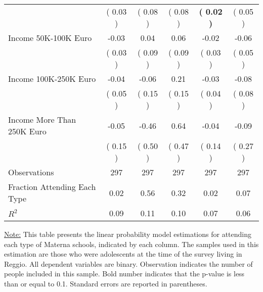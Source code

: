 \begin{table}[H]
{\begin{tabular}{lccccc}
\quad  & (     0.03 ) & (     0.08 )  & (     0.08 )  & \textbf{(     0.02 )} & (     0.05 ) \\
\quad Income 50K-100K Euro &     -0.03 &      0.04 &      0.06 &     -0.02 &     -0.06 \\
\quad  & (     0.03 ) & (     0.09 )  & (     0.09 )  & (     0.03 ) & (     0.05 ) \\
\quad Income 100K-250K Euro &     -0.04 &     -0.06 &      0.21 &     -0.03 &     -0.08 \\
\quad  & (     0.05 ) & (     0.15 )  & (     0.15 )  & (     0.04 ) & (     0.08 ) \\
\quad Income More Than 250K Euro &     -0.05 &     -0.46 &      0.64 &     -0.04 &     -0.09 \\
\quad  & (     0.15 ) & (     0.50 )  & (     0.47 )  & (     0.14 ) & (     0.27 ) \\
\midrule
Observations & 297 & 297 & 297 & 297 & 297 \\
Fraction Attending Each Type &      0.02 &      0.56 &      0.32 &      0.02 &      0.07 \\
\midrule
$ R^2$ &      0.09 &      0.11 &      0.10 &      0.07 &      0.06 \\
\bottomrule
\end{tabular}}
\end{table}
\begin{scriptsize}
\noindent\underline{Note:} This table presents the linear probability model estimations for attending each type of Materna schools, indicated by each column. The samples used in this estimation are those who were adolescents at the time of the survey living in Reggio. All dependent variables are binary. Observation indicates the number of people included in this sample. Bold number indicates that the p-value is less than or equal to 0.1. Standard errors are reported in parentheses.
\end{scriptsize}
